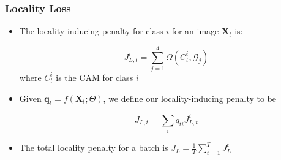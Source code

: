 \begin{frame}
	\frametitle{Locality Loss}
	\begin{itemize}
		\item The locality-inducing penalty for class $i$ for an image $\mathbf{X}_t$ is:
			\begin{block}{}
				\begin{equation*}
					J_{L,t}^{i} = \sum_{j=1}^{4}\Omega(C^i_t, \mathcal G_j)
				\end{equation*}
				where $C^i_{t}$ is the CAM for class $i$
			\end{block}
		\item Given $\mathbf{q}_t = f(\mathbf{X}_t; \Theta)$, we define our locality-inducing penalty to be
			\begin{block}{}
				\begin{equation*}
					J_{L,t} = \sum_{i} q_{ti} J_{L,t}^i
				\end{equation*}
			\end{block}
		\item The total locality penalty for a batch is $J_L =  \frac{1}{T} \sum_{t=1}^T J_L^t$
	\end{itemize}
\end{frame}
